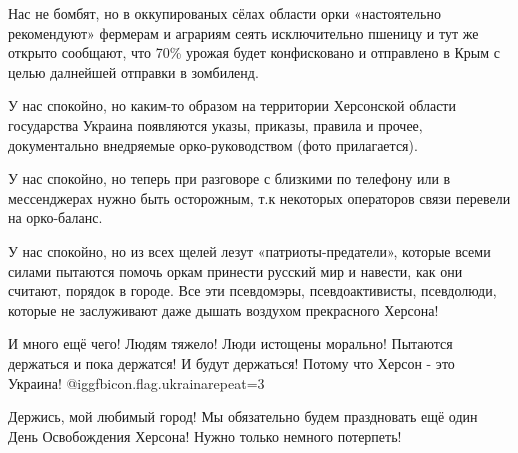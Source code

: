 Нас не бомбят, но в оккупированых сёлах области орки «настоятельно рекомендуют»
фермерам и аграриям сеять исключительно пшеницу и тут же открыто сообщают, что
70\% урожая будет конфисковано и отправлено в Крым с целью далнейшей отправки в
зомбиленд. 


У нас спокойно, но каким-то образом на территории Херсонской области
государства Украина появляются указы, приказы, правила и прочее, документально
внедряемые орко-руководством (фото прилагается). 

У нас спокойно, но теперь при разговоре с близкими по телефону или в
мессенджерах нужно быть осторожным, т.к некоторых операторов связи перевели на
орко-баланс. 


У нас спокойно, но из всех щелей лезут «патриоты-предатели», которые всеми
силами пытаются помочь оркам принести русский мир и навести, как они считают,
порядок в городе. Все эти псевдомэры, псевдоактивисты, псевдолюди, которые не
заслуживают даже дышать воздухом прекрасного Херсона!

И много ещё чего! Людям тяжело! Люди истощены морально! Пытаются держаться и
пока держатся! И будут держаться! Потому что Херсон - это Украина!
@igg{fbicon.flag.ukraina}{repeat=3}

Держись, мой любимый город! Мы обязательно будем праздновать ещё один День
Освобождения Херсона! Нужно только немного потерпеть!

